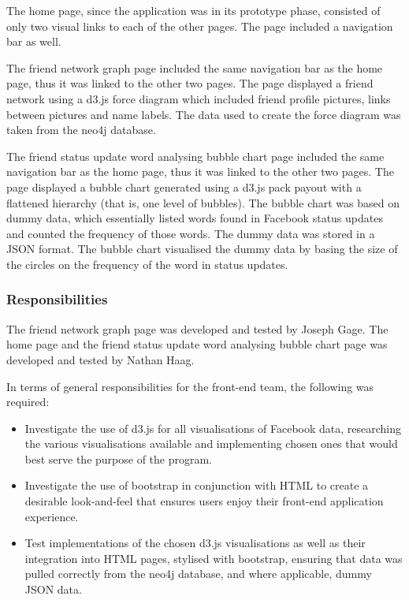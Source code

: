 \documentclass[10pt,onecolumn]{article}
\begin{document}
The home page, since the application was in its prototype phase, consisted of only two visual links to each of the other pages. The page included a navigation bar as well. 

The friend network graph page included the same navigation bar as the home page, thus it was linked to the other two pages. The page displayed a friend network using a d3.js force diagram which included friend profile pictures, links between pictures and name labels. The data used to create the force diagram was taken from the neo4j database. 

The friend status update word analysing bubble chart page included the same navigation bar as the home page, thus it was linked to the other two pages. The page displayed a bubble chart generated using a d3.js pack payout with a flattened hierarchy (that is, one level of bubbles). The bubble chart was based on dummy data, which essentially listed words found in Facebook status updates and counted the frequency of those words. The dummy data was stored in a JSON format. The bubble chart visualised the dummy data by basing the size of the circles on the frequency of the word in status updates. 

\subsubsection{Responsibilities}
The friend network graph page was developed and tested by Joseph Gage. The home page and the friend status update word analysing bubble chart page was developed and tested by Nathan Haag.

In terms of general responsibilities for the front-end team, the following was required:

\begin{itemize}
	\item Investigate the use of d3.js for all visualisations of Facebook data, researching the various visualisations available and implementing chosen ones that would best serve the purpose of the program. 
	\item Investigate the use of bootstrap in conjunction with HTML to create a desirable look-and-feel that ensures users enjoy their front-end application experience. 
	\item Test implementations of the chosen d3.js visualisations as well as their integration into HTML pages, stylised with bootstrap, ensuring that data was pulled correctly from the neo4j database, and where applicable, dummy JSON data.  
\end{itemize}
\end{document}
